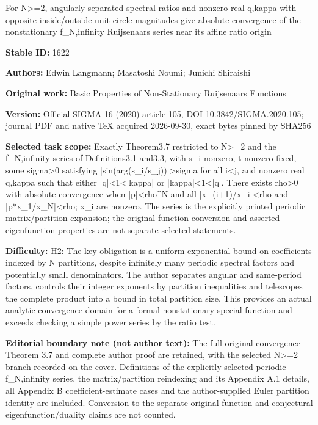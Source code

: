 \documentclass[11pt]{article}
\numberwithin{equation}{section}
\begin{document}
\begin{center}\Large For N>=2, angularly separated spectral ratios and nonzero real q,kappa with opposite inside/outside unit-circle magnitudes give absolute convergence of the nonstationary f\_N,infinity Ruijsenaars series near its affine ratio origin\end{center}
\noindent\textbf{Stable ID:} 1622\par
\noindent\textbf{Authors:} Edwin Langmann; Masatoshi Noumi; Junichi Shiraishi\par
\noindent\textbf{Original work:} Basic Properties of Non-Stationary Ruijsenaars Functions\par
\noindent\textbf{Version:} Official SIGMA 16 (2020) article 105, DOI 10.3842/SIGMA.2020.105; journal PDF and native TeX acquired 2026-09-30, exact bytes pinned by SHA256\par
\noindent\textbf{Selected task scope:} Exactly Theorem3.7 restricted to N>=2 and the f\_N,infinity series of Definitions3.1 and3.3, with s\_i nonzero, t nonzero fixed, some sigma>0 satisfying |sin(arg(s\_i/s\_j))|>sigma for all i<j, and nonzero real q,kappa such that either |q|<1<|kappa| or |kappa|<1<|q|. There exists rho>0 with absolute convergence when |p|<rho\textasciicircum{}N and all |x\_(i+1)/x\_i|<rho and |p*x\_1/x\_N|<rho; x\_i are nonzero. The series is the explicitly printed periodic matrix/partition expansion; the original function conversion and asserted eigenfunction properties are not separate selected statements.\par
\noindent\textbf{Difficulty:} H2: The key obligation is a uniform exponential bound on coefficients indexed by N partitions, despite infinitely many periodic spectral factors and potentially small denominators. The author separates angular and same-period factors, controls their integer exponents by partition inequalities and telescopes the complete product into a bound in total partition size. This provides an actual analytic convergence domain for a formal nonstationary special function and exceeds checking a simple power series by the ratio test.\par
\noindent\textbf{Editorial boundary note (not author text):} The full original convergence Theorem 3.7 and complete author proof are retained, with the selected N>=2 branch recorded on the cover. Definitions of the explicitly selected periodic f\_N,infinity series, the matrix/partition reindexing and its Appendix A.1 details, all Appendix B coefficient-estimate cases and the author-supplied Euler partition identity are included. Conversion to the separate original function and conjectural eigenfunction/duality claims are not counted.\par
\end{document}
